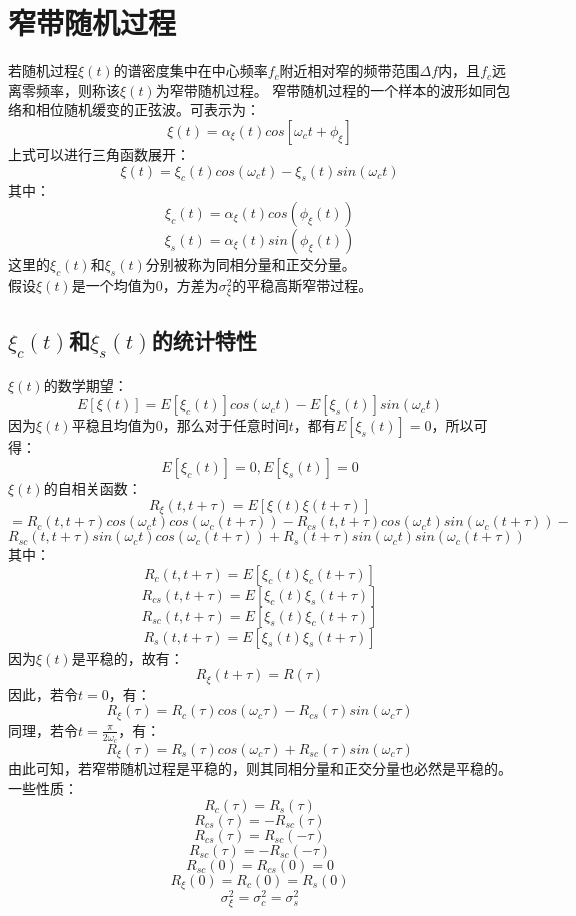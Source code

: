 \documentclass[12pt,a4paper,oneside]{ctexart}
\begin{document}
\section{窄带随机过程}
若随机过程$\xi(t)$的谱密度集中在中心频率$f_{c}$附近相对窄的频带范围$\Delta f$内，且$f_{c}$远离零频率，则称该$\xi(t)$为窄带随机过程。
窄带随机过程的一个样本的波形如同包络和相位随机缓变的正弦波。可表示为：
$$
    \xi(t) = \alpha_{\xi}(t)cos\left[\omega_{c}t + \phi_{\xi} \right]
$$
上式可以进行三角函数展开：
$$
    \xi(t) = \xi_{c}(t)cos(\omega_{c}t) - \xi_{s}(t)sin(\omega_{c}t)
$$
其中：
$$
    \xi_{c}(t) = \alpha_{\xi}(t)cos(\phi_{\xi}(t))
$$
$$
    \xi_{s}(t) = \alpha_{\xi}(t)sin(\phi_{\xi}(t))
$$
这里的$\xi_{c}(t)$和$\xi_{s}(t)$分别被称为同相分量和正交分量。\\
假设$\xi(t)$是一个均值为0，方差为$\sigma^{2}_{\xi}$的平稳高斯窄带过程。
\subsection{$\xi_{c}(t)$和$\xi_{s}(t)$的统计特性}
$\xi(t)$的数学期望：
$$
    E\left[\xi(t)\right] = E\left[\xi_{c}(t)\right]cos(\omega_{c}t) - E\left[\xi_{s}(t)\right]sin(\omega_{c}t)
$$
因为$\xi(t)$平稳且均值为0，那么对于任意时间$t$，都有$E\left[\xi_{s}(t)\right] = 0$，所以可得：
$$
    E\left[\xi_{c}(t)\right] = 0,E\left[\xi_{s}(t)\right] = 0
$$
$\xi(t)$的自相关函数：
$$
    R_{\xi}(t,t + \tau) = E\left[\xi(t)\xi(t + \tau)\right]
$$
$$
     = R_{c}(t,t + \tau)cos(\omega_{c}t)cos(\omega_{c}(t + \tau))  - R_{cs}(t,t + \tau)cos(\omega_{c}t)sin(\omega_{c}(t + \tau)) - 
$$
$$
    R_{sc}(t,t + \tau)sin(\omega_{c}t)cos(\omega_{c}(t + \tau)) + R_{s}(t + \tau)sin(\omega_{c}t)sin(\omega_{c}(t + \tau))
$$
其中：
$$
    R_{c}(t,t + \tau) = E\left[\xi_{c}(t)\xi_{c}(t + \tau)\right]
$$
$$
    R_{cs}(t, t + \tau) = E\left[\xi_{c}(t)\xi_{s}(t + \tau)\right]
$$
$$
    R_{sc}(t, t + \tau) = E\left[\xi_{s}(t)\xi_{c}(t + \tau)\right]
$$
$$
    R_{s}(t, t + \tau) = E\left[\xi_{s}(t)\xi_{s}(t + \tau)\right]
$$
因为$\xi(t)$是平稳的，故有：
$$
    R_{\xi}(t + \tau) = R(\tau)
$$
因此，若令$t = 0$，有：
$$
    R_{\xi}(\tau)  = R_{c}(\tau)cos(\omega_{c}\tau) - R_{cs}(\tau)sin(\omega_{c}\tau)
$$
同理，若令$t = \frac{\pi}{2\omega_{c}}$，有：
$$
    R_{\xi}(\tau) = R_{s}(\tau)cos(\omega_{c}\tau) + R_{sc}(\tau)sin(\omega_{c}\tau)
$$
由此可知，若窄带随机过程是平稳的，则其同相分量和正交分量也必然是平稳的。\\
一些性质：
$$
    R_{c}(\tau) = R_{s}(\tau)
$$
$$
    R_{cs}(\tau) = -R_{sc}(\tau)
$$
$$
    R_{cs}(\tau) = R_{sc}(-\tau)
$$
$$
    R_{sc}(\tau) = -R_{sc}(-\tau)
$$
$$
    R_{sc}(0) = R_{cs}(0) = 0
$$
$$
    R_{\xi}(0) = R_{c}(0) = R_{s}(0)
$$
$$
    \sigma^{2}_{\xi} = \sigma^{2}_{c} = \sigma^{2}_{s}
$$
\end{document}
